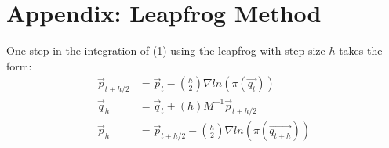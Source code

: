 \documentclass[12pt,a4paper]{article}
\begin{document}
\section{Appendix: Leapfrog Method}
One step in the integration of (1) using the leapfrog with step-size $h$ takes the form:
\begin{equation}
\begin{split}
\vec{p}_{t+h/2} &= \vec{p}_t - (\frac{h}{2})  \nabla ln(\pi(\vec{q_t}))\\
\vec{q}_h &= \vec{q}_t + (h)M^{-1} \vec{p}_{t+h/2} \\
\vec{p}_h &= \vec{p}_{t+h/2} - (\frac{h}{2})  \nabla ln(\pi(\vec{q_{t+h}})) \\
\end{split}
\end{equation}

\printbibliography
\end{document}
